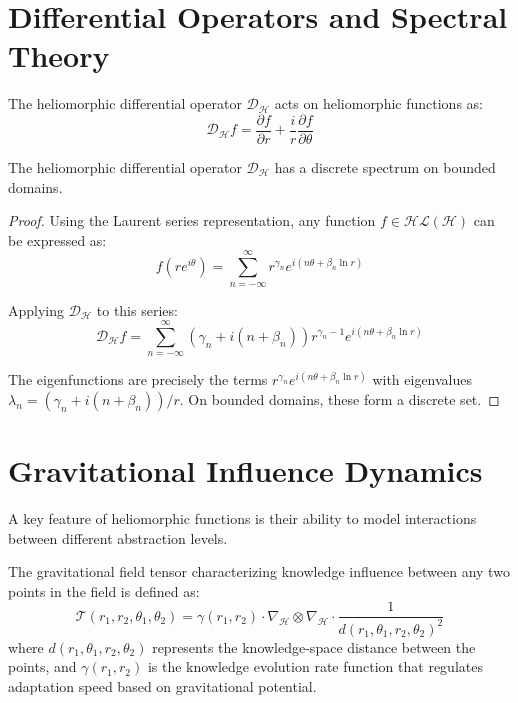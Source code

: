 \begin{theorem}
\section{Differential Operators and Spectral Theory}

\begin{definition}
The heliomorphic differential operator $\mathcal{D}_{\mathcal{H}}$ acts on heliomorphic functions as:
\begin{equation}
\mathcal{D}_{\mathcal{H}}f = \frac{\partial f}{\partial r} + \frac{i}{r}\frac{\partial f}{\partial \theta}
\end{equation}
\end{definition}

\begin{theorem}
The heliomorphic differential operator $\mathcal{D}_{\mathcal{H}}$ has a discrete spectrum on bounded domains.
\end{theorem}

\begin{proof}
Using the Laurent series representation, any function $f \in \mathcal{HL}(\mathcal{H})$ can be expressed as:
\begin{equation}
f(re^{i\theta}) = \sum_{n=-\infty}^{\infty} r^{\gamma_n} e^{i(n\theta + \beta_n \ln r)}
\end{equation}

Applying $\mathcal{D}_{\mathcal{H}}$ to this series:
\begin{equation}
\mathcal{D}_{\mathcal{H}}f = \sum_{n=-\infty}^{\infty} (\gamma_n + i(n + \beta_n))r^{\gamma_n-1} e^{i(n\theta + \beta_n \ln r)}
\end{equation}

The eigenfunctions are precisely the terms $r^{\gamma_n} e^{i(n\theta + \beta_n \ln r)}$ with eigenvalues $\lambda_n = (\gamma_n + i(n + \beta_n))/r$. On bounded domains, these form a discrete set.
\end{proof}

\section{Gravitational Influence Dynamics}

A key feature of heliomorphic functions is their ability to model interactions between different abstraction levels.

\begin{definition}
The gravitational field tensor characterizing knowledge influence between any two points in the field is defined as:
\begin{equation}
\mathcal{T}(r_1, r_2, \theta_1, \theta_2) = \gamma(r_1, r_2) \cdot \nabla_{\mathcal{H}} \otimes \nabla_{\mathcal{H}} \cdot \frac{1}{d(r_1,\theta_1,r_2,\theta_2)^2}
\end{equation}
where $d(r_1,\theta_1,r_2,\theta_2)$ represents the knowledge-space distance between the points, and $\gamma(r_1, r_2)$ is the knowledge evolution rate function that regulates adaptation speed based on gravitational potential.
\end{definition}


\end{theorem}
